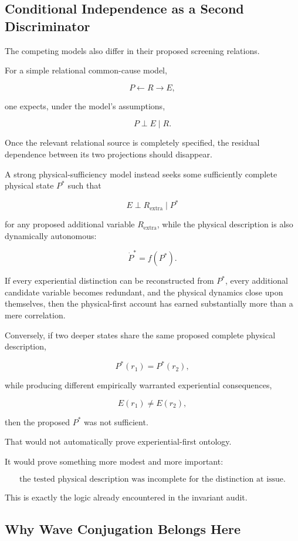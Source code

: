 \subsection{Conditional Independence as a Second Discriminator}

The competing models also differ in their proposed screening relations.

For a simple relational common-cause model,

\[
P\longleftarrow R\longrightarrow E,
\]

one expects, under the model's assumptions,

\[
P\perp E\mid R.
\]

Once the relevant relational source is completely specified, the residual dependence between its two projections should disappear.

A strong physical-sufficiency model instead seeks some sufficiently complete physical state $P^\ast$ such that

\[
E\perp R_{\mathrm{extra}}\mid P^\ast
\]

for any proposed additional variable $R_{\mathrm{extra}}$, while the physical description is also dynamically autonomous:

\[
\dot P^\ast=f(P^\ast).
\]

If every experiential distinction can be reconstructed from $P^\ast$, every additional candidate variable becomes redundant, and the physical dynamics close upon themselves, then the physical-first account has earned substantially more than a mere correlation.

Conversely, if two deeper states share the same proposed complete physical description,

\[
P^\ast(r_1)=P^\ast(r_2),
\]

while producing different empirically warranted experiential consequences,

\[
E(r_1)\neq E(r_2),
\]

then the proposed $P^\ast$ was not sufficient.

That would not automatically prove experiential-first ontology.

It would prove something more modest and more important:

\[
\boxed{
\text{the tested physical description was incomplete for the distinction at issue.}
}
\]

This is exactly the logic already encountered in the invariant audit.

\subsection{Why Wave Conjugation Belongs Here}

